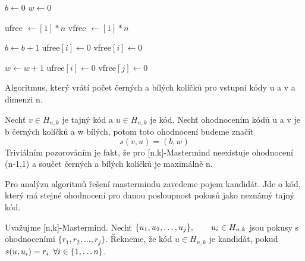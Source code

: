 \begin{algorithm}
\begin{algorithmic}[1]  %
    \State $b \gets 0$
    \State $w \gets 0$
    
    \State ufree $ \gets [1]*n$ 
    \State vfree $ \gets [1]*n$
    
          \State $b \gets b+1$ 
          \State ufree$[i]  \gets 0$
          \State vfree$[i] \gets 0$
        \EndIf
    \EndFor

    
              \State $w \gets w+1$ 
              \State ufree$[i]  \gets 0$
              \State vfree$[j] \gets 0$
            \EndIf
            \EndFor
    \EndIf
    \EndFor
	
\EndFunction
\end{algorithmic}
\caption{Algoritmus, který vrátí počet černých a bílých kolíčků pro vstupní kódy u a v a dimenzi n.}
\label{isprime}
\end{algorithm}


Nechť $v \in H_{n,k}$ je tajný kód a $u \in H_{n,k}$ je kód. Nechť ohodnocením kódů u a v je b černých kolíčků a w bílých, potom toto ohodnocení budeme značit \[s(v, u) = (b,w) \]
Triviálním pozorováním je fakt, že pro [n,k]-Mastermind neexistuje ohodnocení (n-1,1) a součet černých a bílých kolíčků je maximálně n. 

Pro analýzu algoritmů řešení mastermindu zavedeme pojem kandidát. Jde o kód, který má stejné ohodnocení pro danou posloupnost pokusů jako neznámý tajný kód. 
\begin{definice}[kandidát]\label{def01:2}
  Uvažujme [n,k]-Mastermind. Nechť $\{u_1, u_2, \dots, u_j\}, \hspace{20px} u_i \in H_{n,k}$ jsou pokusy s ohodnoceními $\{r_1, r_2, \dots, r_j\}$. Řekneme, že kód $u \in H_{n,k}$ je kandidát, pokud $s(u,u_i) = r_i \hspace{5px} \forall i \in \{1, \dots n\}$. 
\end{definice}

